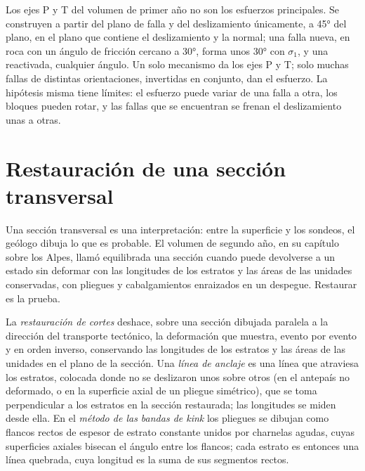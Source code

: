 Los ejes P y T del volumen de primer año no son los esfuerzos principales. Se construyen
a partir del plano de falla y del deslizamiento únicamente, a \ang{45} del plano, en el
plano que contiene el deslizamiento y la normal; una falla nueva, en roca con un
ángulo de fricción cercano a \ang{30}, forma unos \ang{30} con $\sigma_1$, y una
reactivada, cualquier ángulo. Un solo mecanismo da los ejes P y T; solo muchas
fallas de distintas orientaciones, invertidas en conjunto, dan el esfuerzo. La
hipótesis misma tiene límites: el esfuerzo puede variar de una falla a otra, los
bloques pueden rotar, y las fallas que se encuentran se frenan el deslizamiento unas a otras.

\section{Restauración de una sección transversal}\label{sec:b3:structural-analysis:restoration}

Una sección transversal es una interpretación: entre la superficie y los sondeos,
el geólogo dibuja lo que es probable. El volumen de segundo año, en su capítulo sobre los
Alpes, llamó equilibrada una sección cuando puede devolverse a un estado sin deformar
con las longitudes de los estratos y las áreas de las unidades conservadas, con pliegues
y cabalgamientos enraizados en un despegue. Restaurar es la prueba.

\begin{definition}\label{def:b3:structural-analysis:restoration}
La \emph{restauración de cortes} deshace, sobre una
sección dibujada paralela a la dirección del transporte tectónico, la
deformación que muestra, evento por evento y en orden inverso, conservando las
longitudes de los estratos y las áreas de las unidades en el plano de la sección.
Una \emph{línea de anclaje} es una línea que atraviesa los estratos, colocada donde
no se deslizaron unos sobre otros (en el antepaís no deformado, o en la superficie axial
de un pliegue simétrico), que se toma perpendicular a los estratos
en la sección restaurada; las longitudes se miden desde ella. En el
\emph{método de las bandas de kink} los pliegues se dibujan como
flancos rectos de espesor de estrato constante unidos por charnelas agudas, cuyas
superficies axiales bisecan el ángulo entre los flancos; cada estrato es entonces una línea quebrada, cuya
longitud es la suma de sus segmentos rectos.
\end{definition}

